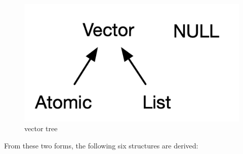 \documentclass[]{book}
\begin{document}
\begin{figure}
\centering
\includegraphics{R/RDataWrangling/images/summary_tree.png}
\caption{vector tree}
\end{figure}

From these two forms, the following six structures are derived:
\end{document}
